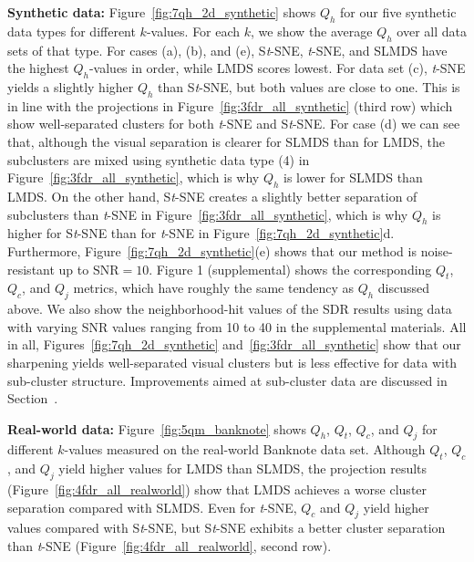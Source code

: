 \documentclass[sagev,Afour,times]{sagej}
\begin{document}
\noindent\textbf{Synthetic data:} Figure~\ref{fig:7qh_2d_synthetic} shows $Q_h$ for our five synthetic data types for different $k$-values. For each $k$, we show the average $Q_h$ over all data sets of that type. For cases (a), (b), and (e), S\emph{t}-SNE, \emph{t}-SNE, and SLMDS have the highest $Q_h$-values in order, while LMDS scores lowest. For data set (c), \emph{t}-SNE yields a slightly higher $Q_h$ than S\emph{t}-SNE, but both values are close to one. This is in line with the projections in Figure~\ref{fig:3fdr_all_synthetic} (third row) which show well-separated clusters for both \emph{t}-SNE and S\emph{t}-SNE. For case (d) we can see that, although the visual separation is clearer for SLMDS than for LMDS, the subclusters are mixed using synthetic data type (4) in Figure~\ref{fig:3fdr_all_synthetic}, which is why $Q_h$ is lower for SLMDS than LMDS. On the other hand, S\emph{t}-SNE creates a slightly better separation of subclusters than \emph{t}-SNE in Figure~\ref{fig:3fdr_all_synthetic}, which is why $Q_h$ is higher for S\emph{t}-SNE than for \emph{t}-SNE in Figure~\ref{fig:7qh_2d_synthetic}d. Furthermore, Figure~\ref{fig:7qh_2d_synthetic}(e) shows that our method is noise-resistant up to $\mbox{SNR}=10$. 
Figure 1 (supplemental) shows the corresponding $Q_t$, $Q_c$, and $Q_j$ metrics, which have roughly the same tendency as $Q_h$ discussed above. We also show the neighborhood-hit values of the SDR results using data with varying SNR values ranging from 10 to 40 in the supplemental materials. All in all, Figures~\ref{fig:7qh_2d_synthetic} and~\ref{fig:3fdr_all_synthetic} show that our sharpening yields well-separated visual clusters but is less effective for data with sub-cluster structure. Improvements aimed at sub-cluster data are discussed in Section~.

\noindent\textbf{Real-world data:}
%
%
Figure~\ref{fig:5qm_banknote} shows $Q_h$, $Q_t$, $Q_c$, and $Q_j$ for different $k$-values measured on the real-world Banknote data set. Although $Q_t$, $Q_c$, and $Q_j$ yield higher values for LMDS than SLMDS, the projection results (Figure~\ref{fig:4fdr_all_realworld}) show that LMDS achieves a worse cluster separation compared with SLMDS. Even for \emph{t}-SNE, $Q_c$ and $Q_j$ yield higher values compared with S\emph{t}-SNE, but S\emph{t}-SNE exhibits a better cluster separation than \emph{t}-SNE (Figure~\ref{fig:4fdr_all_realworld}, second row).
\end{document}
